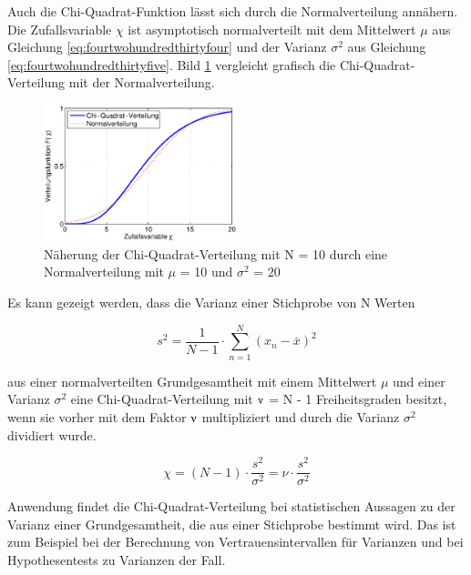\noindent Auch die Chi-Quadrat-Funktion l\"{a}sst sich durch die Normalverteilung ann\"{a}hern. Die Zufallsvariable $\chi$ ist asymptotisch normalverteilt mit dem Mittelwert $\mu$ aus Gleichung \eqref{eq:fourtwohundredthirtyfour} und der Varianz $\sigma^{2}$ aus Gleichung \eqref{eq:fourtwohundredthirtyfive}. Bild \ref{fig:Testverteilungen_ChiQuadrat2} vergleicht grafisch die Chi-Quadrat-Verteilung mit der Normalverteilung.

\begin{figure}[H]
  \centerline{\includegraphics[width=0.5\textwidth]{Kapitel4/Bilder/image43}}
  \caption{N\"{a}herung der Chi-Quadrat-Verteilung mit N = 10 durch eine Normalverteilung mit $\mu$ = 10 und $\sigma^{2}$ = 20}
  \label{fig:Testverteilungen_ChiQuadrat2}
\end{figure}

\clearpage 

\noindent Es kann gezeigt werden, dass die Varianz einer Stichprobe von N Werten 

\begin{equation}\label{eq:fourtwohundredthirtysix}
s^{2} =\dfrac{1}{N-1} \cdot \sum _{n=1}^{N}\left(x_{n} -\bar{x}\right)^{2}
\end{equation}

\noindent aus einer normalverteilten Grundgesamtheit mit einem Mittelwert $\mu$ und einer Varianz $\sigma^{2}$ eine Chi-Quadrat-Verteilung mit $\nuup$ = N - 1 Freiheitsgraden besitzt, wenn sie vorher mit dem Faktor $\nuup$ multipliziert und durch die Varianz $\sigma^{2}$ dividiert wurde.

\begin{equation}\label{eq:fourtwohundredthirtyseven}
\chi =(N-1)\cdot \dfrac{s^{2} }{\sigma ^{2}} =\nu \cdot \dfrac{s^{2}}{\sigma ^{2}}
\end{equation}

\noindent Anwendung findet die Chi-Quadrat-Verteilung bei statistischen Aussagen zu der Varianz einer Grundgesamtheit, die aus einer Stichprobe bestimmt wird. Das ist zum Beispiel bei der Berechnung von Vertrauensintervallen f\"{u}r Varianzen und bei Hypothesentests zu Varianzen der Fall.


